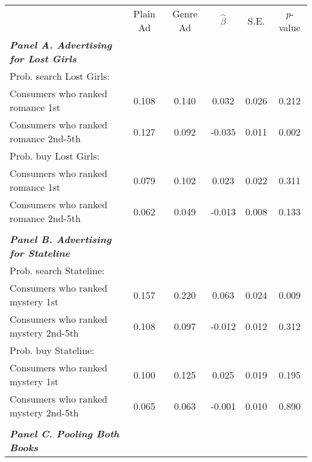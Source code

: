 \begin{center}
\begin{tabular}{lccccc}
\hline \noalign{\smallskip} & Plain Ad & Genre Ad & $\hat{\beta}$ & S.E. & \emph{p}-value\\
\noalign{\smallskip}\hline \noalign{\smallskip}\textbf{\emph{Panel A. Advertising for Lost Girls}} &  &  &  &  & \\
\hspace{5pt} Prob. search Lost Girls: &  &  &  &  & \\
\hspace{5pt} Consumers who ranked romance 1st & 0.108 & 0.140 & 0.032 & 0.026 & 0.212\\
\hspace{5pt} Consumers who ranked romance 2nd-5th & 0.127 & 0.092 & -0.035 & 0.011 & 0.002\\
\hspace{5pt} Prob. buy Lost Girls: &  &  &  &  & \\
\hspace{5pt} Consumers who ranked romance 1st & 0.079 & 0.102 & 0.023 & 0.022 & 0.311\\
\hspace{5pt} Consumers who ranked romance 2nd-5th & 0.062 & 0.049 & -0.013 & 0.008 & 0.133\\
  &  &  &  &  & \\
\textbf{\emph{Panel B. Advertising for Stateline}} &  &  &  &  & \\
\hspace{5pt} Prob. search Stateline: &  &  &  &  & \\
\hspace{5pt} Consumers who ranked mystery 1st & 0.157 & 0.220 & 0.063 & 0.024 & 0.009\\
\hspace{5pt} Consumers who ranked mystery 2nd-5th & 0.108 & 0.097 & -0.012 & 0.012 & 0.312\\
\hspace{5pt} Prob. buy Stateline: &  &  &  &  & \\
\hspace{5pt} Consumers who ranked mystery 1st & 0.100 & 0.125 & 0.025 & 0.019 & 0.195\\
\hspace{5pt} Consumers who ranked mystery 2nd-5th & 0.065 & 0.063 & -0.001 & 0.010 & 0.890\\
  &  &  &  &  & \\
\textbf{\emph{Panel C. Pooling Both Books}} &  &  &  &  & \\

\end{tabular}
\end{center}
